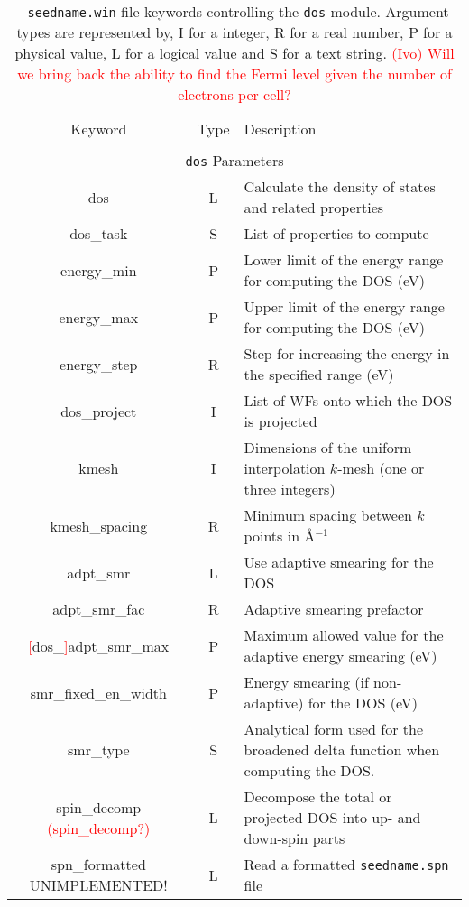 \begin{table}[hH!]
\begin{center}
\begin{tabular}{|c|c|p{6cm}|}
  \hline
  Keyword & Type & Description \\
  &      &             \\
  \hline\hline
  \multicolumn{3}{|c|}{{\tt dos} Parameters} \\
  \hline
  {\sc dos}  & L & Calculate the density of states and related properties\\
  {\sc dos\_task}& S  & List of properties to compute \\
  {\sc [dos\_]energy\_min} & P & Lower limit of the energy range for
  computing the DOS (eV)\\
  {\sc [dos\_]energy\_max}& P & Upper limit of the energy range for
  computing the DOS (eV)\\
  {\sc [dos\_]energy\_step}& R & Step for increasing the energy in the specified range (eV)\\
  {\sc dos\_project}& I & List of WFs onto which the DOS is projected\\
  {\sc [dos\_]kmesh} & I & Dimensions of the uniform interpolation $k$-mesh (one or three integers)\\ 
  {\sc [dos\_]kmesh\_spacing}& R & Minimum spacing between $k$ points in \AA$^{-1}$\\
  {\sc [dos\_]adpt\_smr} & L & Use adaptive smearing for the DOS \\
  {\sc [dos\_]adpt\_smr\_fac} & R & Adaptive smearing prefactor\\
  {\sc \textcolor{red}{[}dos\_\textcolor{red}{]}adpt\_smr\_max} & P & Maximum allowed value for the adaptive energy smearing (eV) \\
  {\sc [dos\_]smr\_fixed\_en\_width} & P  & Energy smearing (if non-adaptive) for the DOS (eV) \\   
  {\sc [dos\_]smr\_type} & S & Analytical form used for the broadened delta function
  when computing the DOS. \\
  {\sc spin\_decomp} \textcolor{red}{({\sc [dos\_]spin\_decomp}?)}& L & 
Decompose the total or projected DOS into up- and down-spin parts\\
  {\sc spn\_formatted} {\color{red}UNIMPLEMENTED!} & L & 
  Read a formatted {\tt seedname.spn} file\\
  \hline
\end{tabular}
\caption[Parameter file keywords controlling the DOS module.]  {{\tt
    seedname.win} file keywords controlling the {\tt dos}
  module. Argument types are represented by, I for a integer, R for a
  real number, P for a physical value, L for a logical value and S for
  a text string.  \textcolor{red}{(Ivo) Will we bring back the ability
    to find the Fermi level given the number of electrons per cell?}
}
\label{parameter_keywords_dos}
\end{center}
\end{table}


